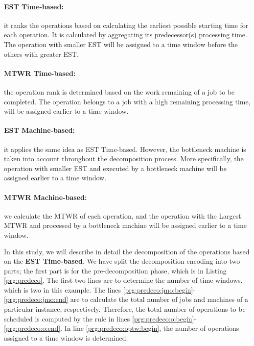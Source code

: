 \documentclass{tlp} %
\begin{document}
\paragraph{\textbf{EST Time-based}:} it ranks the operations based on calculating the earliest possible starting time for each operation. It is calculated by aggregating its predecessor(s) processing time. The operation with smaller EST will be assigned to a time window before the others with greater EST.

\paragraph{\textbf{MTWR Time-based}:} the operation rank is determined based on the work remaining of a job to be completed. The operation belongs to a job with a high remaining processing time, will be assigned earlier to a time window.

\paragraph{\textbf{EST Machine-based}:} it applies the same idea as EST Time-based. However, the bottleneck machine is taken into account throughout the decomposition process. More specifically, the operation with smaller EST and executed by a bottleneck machine will be assigned earlier to a time window.

\paragraph{\textbf{MTWR Machine-based}:} we calculate the MTWR of each operation, and the operation with the Largest MTWR and processed by a bottleneck machine will be assigned earlier to a time window.

In this study, we will describe in detail the decomposition of the operations based on the \textbf{EST Time-based}. We have split the decomposition encoding into two parts; the first part is for the pre-decomposition phase, which is in Listing \ref{prg:predeco}. The first two lines are to determine the number of time windows, which is two in this example. The lines \ref{prg:predeco:jmo:begin}-\ref{prg:predeco:jmo:end} are to calculate the total number of jobs and machines of a particular instance, respectively. Therefore, the total number of operations to be scheduled is computed by the rule in lines \ref{prg:predeco:o:begin}-\ref{prg:predeco:o:end}. In line \ref{prg:predeco:optw:begin}, the number of operations assigned to a time window is determined. 
\end{document}
